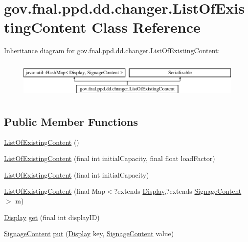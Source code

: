 \hypertarget{classgov_1_1fnal_1_1ppd_1_1dd_1_1changer_1_1ListOfExistingContent}{\section{gov.\-fnal.\-ppd.\-dd.\-changer.\-List\-Of\-Existing\-Content Class Reference}
\label{classgov_1_1fnal_1_1ppd_1_1dd_1_1changer_1_1ListOfExistingContent}
}
Inheritance diagram for gov.\-fnal.\-ppd.\-dd.\-changer.\-List\-Of\-Existing\-Content\-:\begin{figure}[H]
\begin{center}
\leavevmode
\includegraphics[height=1.931034cm]{classgov_1_1fnal_1_1ppd_1_1dd_1_1changer_1_1ListOfExistingContent}
\end{center}
\end{figure}
\subsection*{Public Member Functions}
\begin{DoxyCompactItemize}
\item 
\hyperlink{classgov_1_1fnal_1_1ppd_1_1dd_1_1changer_1_1ListOfExistingContent_a65e9c72fed68f71681551ba745df01bc}{List\-Of\-Existing\-Content} ()
\item 
\hyperlink{classgov_1_1fnal_1_1ppd_1_1dd_1_1changer_1_1ListOfExistingContent_a4a0caee5f3a804c6a332229a6c3be125}{List\-Of\-Existing\-Content} (final int initial\-Capacity, final float load\-Factor)
\item 
\hyperlink{classgov_1_1fnal_1_1ppd_1_1dd_1_1changer_1_1ListOfExistingContent_ae7e0596f68714aa4d495de13952338db}{List\-Of\-Existing\-Content} (final int initial\-Capacity)
\item 
\hyperlink{classgov_1_1fnal_1_1ppd_1_1dd_1_1changer_1_1ListOfExistingContent_a7fc459c692b7d81691774da95159ab6a}{List\-Of\-Existing\-Content} (final Map$<$?extends \hyperlink{interfacegov_1_1fnal_1_1ppd_1_1dd_1_1signage_1_1Display}{Display},?extends \hyperlink{interfacegov_1_1fnal_1_1ppd_1_1dd_1_1signage_1_1SignageContent}{Signage\-Content} $>$ m)
\item 
\hyperlink{interfacegov_1_1fnal_1_1ppd_1_1dd_1_1signage_1_1Display}{Display} \hyperlink{classgov_1_1fnal_1_1ppd_1_1dd_1_1changer_1_1ListOfExistingContent_ac46b8d64363de8a10423c7d620d98593}{get} (final int display\-I\-D)
\item 
\hyperlink{interfacegov_1_1fnal_1_1ppd_1_1dd_1_1signage_1_1SignageContent}{Signage\-Content} \hyperlink{classgov_1_1fnal_1_1ppd_1_1dd_1_1changer_1_1ListOfExistingContent_a946a8fbe31fde4f9a1ead3a68e0912ae}{put} (\hyperlink{interfacegov_1_1fnal_1_1ppd_1_1dd_1_1signage_1_1Display}{Display} key, \hyperlink{interfacegov_1_1fnal_1_1ppd_1_1dd_1_1signage_1_1SignageContent}{Signage\-Content} value)
\end{DoxyCompactItemize}


